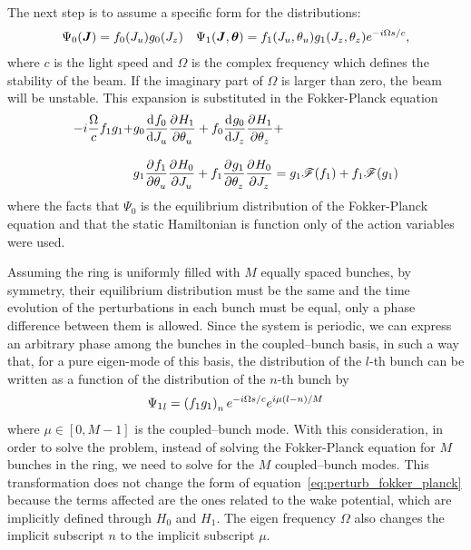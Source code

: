     The next step is to assume a specific form for the distributions:
    \begin{align}
        \Psi_0(\boldsymbol{J}) = f_0(J_u)g_0(J_z) && \Psi_1(\boldsymbol{J}, \boldsymbol{\theta}) = f_1(J_u, \theta_u)g_1(J_z, \theta_z)e^{-i\Omega s/c},
    \end{align}
    where $c$ is the light speed and $\Omega$ is the complex frequency which defines the stability of the beam. If the imaginary part of $\Omega$ is larger than zero, the beam will be unstable. This expansion is substituted in the Fokker-Planck equation
    \begin{align}\label{eq:perturb_fokker_planck}
        -i\frac{\Omega}{c}f_1g_1 +
        &g_0\frac{\mathrm{d}^{{}}f_0}{\mathrm{d} J_u^{{}}}\frac{\partial^{{}}H_1}{\partial \theta_u^{{}}} + f_0\frac{\mathrm{d}^{{}}g_0}{\mathrm{d} J_z^{{}}}\frac{\partial^{{}}H_1}{\partial \theta_z^{{}}} +\nonumber\\[3mm] &g_1\frac{\partial^{{}}f_1}{\partial \theta_u^{{}}}\frac{\partial^{{}}H_0}{\partial J_u^{{}}} +
        f_1\frac{\partial^{{}}g_1}{\partial \theta_z^{{}}}\frac{\partial^{{}}H_0}{\partial J_z^{{}}} = g_1\mathscr{F}(f_1) + f_1\mathscr{F}(g_1)
    \end{align}
    where the facts that $\Psi_0$ is the equilibrium distribution of the Fokker-Planck equation and that the static Hamiltonian is function only of the action variables were used.

    Assuming the ring is uniformly filled with $M$ equally spaced bunches, by symmetry, their equilibrium distribution must be the same and the time evolution of the perturbations in each bunch must be equal, only a phase difference between them is allowed. Since the system is periodic, we can express an arbitrary phase among the bunches in the coupled--bunch basis, in such a way that, for a pure eigen-mode of this basis, the distribution of the $l$-th bunch can be written as a function of the distribution of the $n$-th bunch by
    \begin{align}
        {\Psi_1}_l  = \left(f_1g_1\right)_ne^{-i\Omega s/c}e^{i\mu\left(l-n\right)/M}
    \end{align}
    where $\mu \in [0,M-1]$ is the coupled--bunch mode. With this consideration, in order to solve the problem, instead of solving the Fokker-Planck equation for $M$ bunches in the ring, we need to solve for the $M$ coupled--bunch modes. This transformation does not change the form of equation~\eqref{eq:perturb_fokker_planck} because the terms affected are the ones related to the wake potential, which are implicitly defined through $H_0$ and $H_1$. The eigen frequency $\Omega$ also changes the implicit subscript $n$ to the implicit subscript $\mu$.

